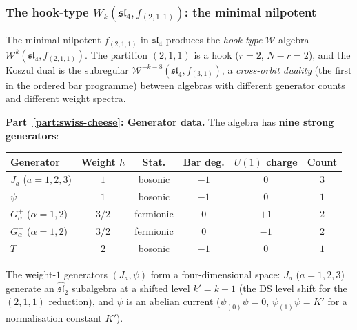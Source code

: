 \subsubsection{The hook-type
$W_k(\mathfrak{sl}_4,f_{(2,1,1)})$:
the minimal nilpotent}
\label{subsubsec:ordered-bar-sl4-hook}

\begin{computation}
\label{comp:ordered-bar-sl4-hook}

The minimal nilpotent $f_{(2,1,1)}$ in $\mathfrak{sl}_4$
produces the \emph{hook-type} $\mathcal W$-algebra
$\mathcal W^k(\mathfrak{sl}_4, f_{(2,1,1)})$. The
partition $(2,1,1)$ is a hook ($r = 2$, $N - r = 2$), and
the Koszul dual is the subregular
$\mathcal W^{-k-8}(\mathfrak{sl}_4, f_{(3,1)})$, a
\emph{cross-orbit duality} (the first in the ordered bar
programme) between algebras with different generator
counts and different weight spectra.

\medskip
\noindent\textbf{Part~\ref{part:swiss-cheese}: Generator data.}
The algebra has \textbf{nine strong generators}:
\begin{center}
\renewcommand{\arraystretch}{1.15}
\begin{tabular}{lccccc}
\textbf{Generator} & \textbf{Weight $h$} &
 \textbf{Stat.} & \textbf{Bar deg.} &
 \textbf{$U(1)$ charge} & \textbf{Count} \\
\hline
$J_a$ ($a=1,2,3$) & $1$ & bosonic & $-1$ & $0$ & $3$ \\
$\psi$ & $1$ & bosonic & $-1$ & $0$ & $1$ \\
$G^+_\alpha$ ($\alpha=1,2$) & $3/2$ & fermionic & $0$
 & $+1$ & $2$ \\
$G^-_\alpha$ ($\alpha=1,2$) & $3/2$ & fermionic & $0$
 & $-1$ & $2$ \\
$T$ & $2$ & bosonic & $-1$ & $0$ & $1$
\end{tabular}
\end{center}
The weight-$1$ generators $(J_a, \psi)$ form a
four-dimensional space: $J_a$ ($a=1,2,3$) generate an
$\widehat{\mathfrak{sl}}_2$ subalgebra at a shifted level
$k' = k + 1$ (the DS level shift for the $(2,1,1)$
reduction), and $\psi$ is an abelian current
($\psi_{(0)}\psi = 0$, $\psi_{(1)}\psi = K'$ for
a normalisation constant $K'$).


\end{computation}
